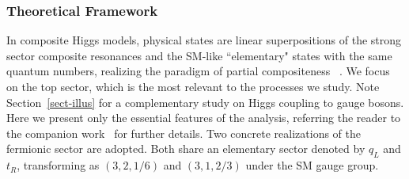 \subsubsection{Theoretical Framework}
\label{MCHM}
In composite Higgs models, physical states are linear superpositions of the strong sector composite resonances
and the SM-like ``elementary" states with the same quantum numbers, realizing the paradigm of partial
compositeness ~\cite{KAPLAN1991259}.
We focus on the top sector,
which is the most relevant to the processes we study. Note Section~\ref{sect-illus} for a complementary study on Higgs coupling to gauge bosons.  Here we present only the essential features of the
 analysis, referring the reader to the companion
work~\cite{MCHMtthh} for further details. Two concrete
realizations of the fermionic sector are adopted. Both share an elementary sector denoted by $q_L$ and
$t_R$, transforming  as $(3,2,1/6)$ and $(3,1,2/3)$ under the SM gauge group.
%

